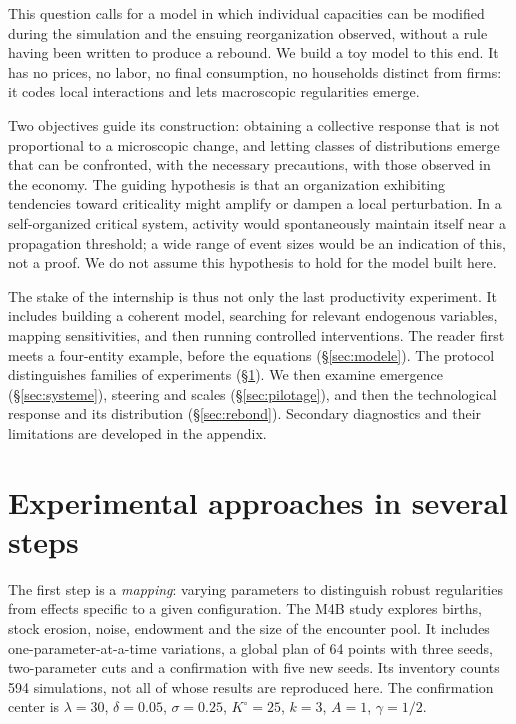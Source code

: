 This question calls for a model in which individual capacities can be
modified during the simulation and the ensuing reorganization observed,
without a rule having been written to produce a rebound. We build a
toy model to this end. It has no prices, no labor, no final
consumption, no households distinct from firms: it codes local
interactions and lets macroscopic regularities emerge.

Two objectives guide its construction: obtaining a collective response
that is not proportional to a microscopic change, and letting classes
of distributions emerge that can be confronted, with the necessary
precautions, with those observed in the economy. The guiding hypothesis
is that an organization exhibiting tendencies toward criticality might
amplify or dampen a local perturbation. In a self-organized critical
system, activity would spontaneously maintain itself near a propagation
threshold; a wide range of event sizes would be an indication of this,
not a proof. We do not assume this hypothesis to hold for the model
built here.

The stake of the internship is thus not only the last productivity
experiment. It includes building a coherent model, searching for
relevant endogenous variables, mapping sensitivities, and then running
controlled interventions. The reader first meets a four-entity example,
before the equations (\S\ref{sec:modele}). The protocol distinguishes
families of experiments (\S\ref{sec:protocole}). We then examine
emergence (\S\ref{sec:systeme}), steering and scales
(\S\ref{sec:pilotage}), and then the technological response and its
distribution (\S\ref{sec:rebond}). Secondary diagnostics and their
limitations are developed in the appendix.



\section{Experimental approaches in several steps}\label{sec:protocole}
The first step is a \emph{mapping}: varying parameters to distinguish
robust regularities from effects specific to a given configuration. The
M4B study explores births, stock erosion, noise, endowment and the size
of the encounter pool. It includes one-parameter-at-a-time variations,
a global plan of 64 points with three seeds, two-parameter cuts and a
confirmation with five new seeds. Its inventory counts 594 simulations,
not all of whose results are reproduced here. The confirmation center is
$\lambda=30$, $\delta=0.05$, $\sigma=0.25$, $K^\circ=25$, $k=3$, $A=1$,
$\gamma=1/2$.

